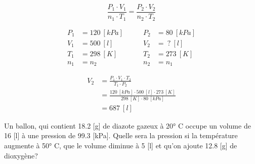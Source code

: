 \documentclass[
  11pt,
  french,
  a4paper,
  openany]{book}
\begin{document}
\begin{Answer}
\[
\frac{P_1 \cdot V_1}{n_1 \cdot T_1} = \frac{P_2 \cdot V_2}{n_2 \cdot T_2}
\]

\[
\begin{split}
    P_1 &= 120\ [kPa]\\
    V_1 &= 500\ [l]\\
    T_1 &= 298\ [K]\\
    n_1 &= n_2
\end{split}
\qquad
\begin{split}
    P_2 &= 80\ [kPa]\\
    V_2 &=\ ?\ [l]\\
    T_2 &= 273\ [K]\\
    n_2 &= n_1
\end{split}
\]

\[
\begin{split}
    V_2 &= \frac{P_1 \cdot V_1 \cdot T_2}{T_1 \cdot P_2} \\
    &= \frac{120\ [kPa] \cdot 500\ [l] \cdot 273\ [K]}{298\ [K] \cdot 80\ [kPa]} \\
    &= 687\ [l]
\end{split}
\]

\end{Answer}

\begin{Exercise}

Un ballon, qui contient 18.2 {[}g{]} de diazote gazeux à 20° C occupe un volume de 16 {[}l{]} à une pression de 99.3 {[}kPa{]}. Quelle sera la pression si la température augmente à 50° C, que le volume diminue à 5 {[}l{]} et qu'on ajoute 12.8 {[}g{]} de dioxygène?



\end{Exercise}
\end{document}
